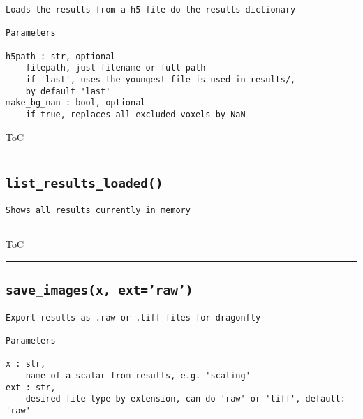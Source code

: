 \documentclass{article}
\begin{document}
\begin{lstlisting}[language=docstring]
Loads the results from a h5 file do the results dictionary

Parameters
----------
h5path : str, optional
    filepath, just filename or full path
    if 'last', uses the youngest file is used in results/, 
    by default 'last'
make_bg_nan : bool, optional
    if true, replaces all excluded voxels by NaN
\end{lstlisting}

\begin{flushright}

\hyperref[toc]{ToC}

\end{flushright}



\vspace{5mm}

\hrule

\subsection*{\texttt{list\_results\_loaded()}}

\begin{lstlisting}[language=docstring]
Shows all results currently in memory
    
\end{lstlisting}

\begin{flushright}

\hyperref[toc]{ToC}

\end{flushright}



\vspace{5mm}

\hrule

\subsection*{\texttt{save\_images(x, ext='raw')}}

\begin{lstlisting}[language=docstring]
Export results as .raw or .tiff files for dragonfly

Parameters
----------
x : str,
    name of a scalar from results, e.g. 'scaling'
ext : str,
    desired file type by extension, can do 'raw' or 'tiff', default: 'raw'
\end{lstlisting}
\end{document}

